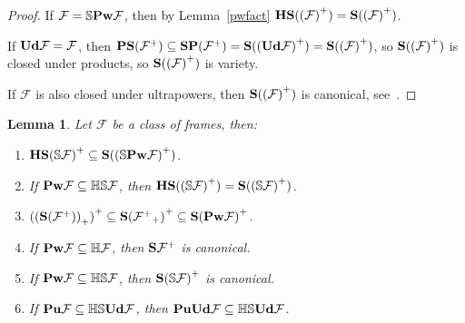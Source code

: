 \documentclass{article}
\theoremstyle{defin}
\theoremstyle{theorem}
\theoremstyle{claim}
\theoremstyle{prop}
\theoremstyle{lemma}
\newtheorem{lemma}{Lemma}
\theoremstyle{fact}
\theoremstyle{remark}
\theoremstyle{ex}
\theoremstyle{col}
\theoremstyle{question}
\begin{document}
\begin{proof}
  If $\mathcal{F} = \mathbb{S} {\bf Pw} \mathcal{F}$, then by Lemma~\ref{pwfact} ${\bf H S} ({(\mathcal{F})}^+) = {\bf S} ({(\mathcal{F})}^+)$.

  If ${\bf Ud}\mathcal{F} = \mathcal{F}$, then ${\bf P S} (\mathcal{F}^+) \subseteq {\bf S P} (\mathcal{F}^+) = {\bf S} ({({\bf Ud} \mathcal{F})}^+) = {\bf S} ({(\mathcal{F})}^+)$, 
  so ${\bf S} ({(\mathcal{F})}^+)$ is closed under products, so ${\bf S} ({(\mathcal{F})}^+)$ is variety.

  If $\mathcal{F}$ is also closed under ultrapowers, then ${\bf S} ({(\mathcal{F})}^+)$ is canonical, see~\cite[Corollary 3.6.3]{goldblatt1989varieties}.
\end{proof}

\begin{lemma}
  Let $\mathcal{F}$ be a class of frames, then:

  \begin{enumerate}
    \item ${\bf H S} {(\mathbb{S} \mathcal{F})}^{+} \subseteq {\bf S} ({({\mathbb{S} {\bf Pw} \mathcal{F}})}^{+})$.
    \item If ${\bf Pw} \mathcal{F} \subseteq \mathbb{H} \mathbb{S} \mathcal{F}$, 
    then ${\bf HS} ({(\mathbb{S} \mathcal{F})}^{+}) = {\bf S} ({(\mathbb{S} \mathcal{F})}^{+})$.
    \item ${({({\bf S} (\mathcal{F}^+))}_+)}^+ \subseteq {\bf S} {({\mathcal{F}^+}_+)}^+ \subseteq {\bf S} {({\bf Pw} \mathcal{F})}^+$.
    \item If ${\bf Pw} \mathcal{F} \subseteq \mathbb{H} \mathcal{F}$, then ${\bf S} \mathcal{F}^+$ is canonical.
    \item If ${\bf Pw} \mathcal{F} \subseteq \mathbb{H} \mathbb{S} \mathcal{F}$, then ${\bf S} {(\mathbb{S} \mathcal{F})}^+$ is canonical.
    \item If ${\bf Pu} \mathcal{F} \subseteq \mathbb{H} \mathbb{S} {\bf Ud} \mathcal{F}$, then ${\bf Pu} {\bf Ud} \mathcal{F} \subseteq \mathbb{H} \mathbb{S} {\bf Ud} \mathcal{F}$.
  \end{enumerate}
\end{lemma}
\end{document}
